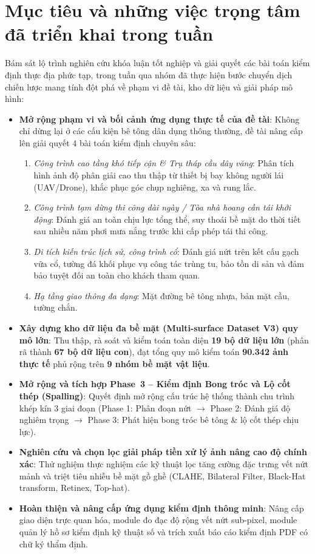 \documentclass[12pt,a4paper]{article}
\begin{document}
\section{Mục tiêu và những việc trọng tâm đã triển khai trong tuần}
Bám sát lộ trình nghiên cứu khóa luận tốt nghiệp và giải quyết các bài toán kiểm định thực địa phức tạp, trong tuần qua nhóm đã thực hiện bước chuyển dịch chiến lược mang tính đột phá về phạm vi đề tài, kho dữ liệu và giải pháp mô hình:
\begin{itemize}[leftmargin=*]
    \item \textbf{Mở rộng phạm vi và bối cảnh ứng dụng thực tế của đề tài}: Không chỉ dừng lại ở các cấu kiện bê tông dân dụng thông thường, đề tài nâng cấp lên giải quyết 4 bài toán kiểm định chuyên sâu:
    \begin{enumerate}[label=(\alph*),leftmargin=*]
        \item \emph{Công trình cao tầng khó tiếp cận \& Trụ tháp cầu dây văng}: Phân tích hình ảnh độ phân giải cao thu thập từ thiết bị bay không người lái (UAV/Drone), khắc phục góc chụp nghiêng, xa và rung lắc.
        \item \emph{Công trình tạm dừng thi công dài ngày / Tòa nhà hoang cần tái khởi động}: Đánh giá an toàn chịu lực tổng thể, suy thoái bề mặt do thời tiết sau nhiều năm phơi mưa nắng trước khi cấp phép tái thi công.
        \item \emph{Di tích kiến trúc lịch sử, công trình cổ}: Đánh giá nứt trên kết cấu gạch vữa cổ, tường đá khối phục vụ công tác trùng tu, bảo tồn di sản và đảm bảo tuyệt đối an toàn cho khách tham quan.
        \item \emph{Hạ tầng giao thông đa dạng}: Mặt đường bê tông nhựa, bản mặt cầu, tường chắn.
    \end{enumerate}
    \item \textbf{Xây dựng kho dữ liệu đa bề mặt (Multi-surface Dataset V3) quy mô lớn}: Thu thập, rà soát và kiểm toán toàn diện \textbf{19 bộ dữ liệu lớn} (phân rã thành \textbf{67 bộ dữ liệu con}), đạt tổng quy mô kiểm toán \textbf{90.342 ảnh thực tế} phủ rộng trên \textbf{9 nhóm bề mặt vật liệu}.
    \item \textbf{Mở rộng và tích hợp Phase~3 -- Kiểm định Bong tróc và Lộ cốt thép (Spalling)}: Quyết định mở rộng cấu trúc hệ thống thành chu trình khép kín 3 giai đoạn (Phase 1: Phân đoạn nứt $\rightarrow$ Phase 2: Đánh giá độ nghiêm trọng $\rightarrow$ Phase 3: Phát hiện bong tróc bê tông \& lộ cốt thép chịu lực).
    \item \textbf{Nghiên cứu và chọn lọc giải pháp tiền xử lý ảnh nâng cao độ chính xác}: Thử nghiệm thực nghiệm các kỹ thuật lọc tăng cường đặc trưng vết nứt mảnh và triệt tiêu nhiễu bề mặt gồ ghề (CLAHE, Bilateral Filter, Black-Hat transform, Retinex, Top-hat).
    \item \textbf{Hoàn thiện và nâng cấp ứng dụng kiểm định thông minh}: Nâng cấp giao diện trực quan hóa, module đo đạc độ rộng vết nứt sub-pixel, module quản lý hồ sơ kiểm định kỹ thuật số và trích xuất báo cáo kiểm định PDF có chữ ký thẩm định.
\end{itemize}
\end{document}
